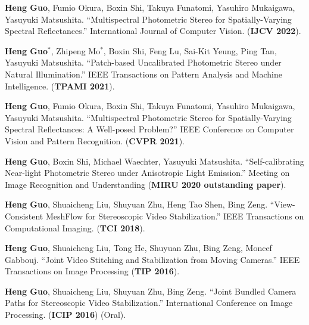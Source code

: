 \begin{enumerate}[label={[\arabic*]}]
	\item \textbf{Heng Guo}, Fumio Okura, Boxin Shi, Takuya Funatomi, Yasuhiro Mukaigawa, Yasuyuki Matsushita. ``Multispectral Photometric Stereo for Spatially-Varying Spectral Reflectances.'' International Journal of Computer Vision. (\textbf{IJCV 2022}). 
	\item \textbf{Heng Guo$^*$}, Zhipeng Mo$^*$, Boxin Shi, Feng Lu, Sai-Kit Yeung, Ping Tan, Yasuyuki Matsushita. ``Patch-based Uncalibrated Photometric Stereo under Natural Illumination.'' 
	IEEE Transactions on Pattern Analysis and Machine Intelligence. (\textbf{TPAMI 2021}). 
	\item \textbf{Heng Guo}, Fumio Okura, Boxin Shi, Takuya Funatomi, Yasuhiro Mukaigawa, Yasuyuki Matsushita. ``Multispectral Photometric Stereo for Spatially-Varying Spectral Reflectances: A Well-posed Problem?'' IEEE Conference on Computer Vision and Pattern Recognition. (\textbf{CVPR 2021}). 
	\item \textbf{Heng Guo}, Boxin Shi, Michael Waechter, Yasuyuki Matsushita. ``Self-calibrating Near-light Photometric Stereo under Anisotropic Light Emission.'' Meeting on Image Recognition and Understanding (\textbf{MIRU 2020 outstanding paper}).  
	\item \textbf{Heng Guo}, Shuaicheng Liu, Shuyuan Zhu, Heng Tao Shen, Bing Zeng. ``View-Consistent MeshFlow for Stereoscopic Video Stabilization.'' IEEE Transactions on Computational Imaging. (\textbf{TCI 2018}).
	\item \textbf{Heng Guo}, Shuaicheng Liu, Tong He, Shuyuan Zhu, Bing Zeng, Moncef Gabbouj. ``Joint Video Stitching and Stabilization from Moving Cameras.'' IEEE Transactions on Image Processing (\textbf{TIP 2016}).
	\item \textbf{Heng Guo}, Shuaicheng Liu, Shuyuan Zhu, Bing Zeng. ``Joint Bundled Camera Paths for Stereoscopic Video Stabilization.'' International Conference on Image Processing. (\textbf{ICIP 2016}) (Oral).
\end{enumerate}